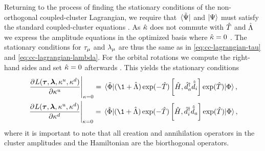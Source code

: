             Returning to the process of finding the stationary conditions of the
            non-orthogonal coupled-cluster Lagrangian, we require that
            $\bra*{\tilde{\Psi}}$ and $\ket{\Psi}$ must satisfy the standard
            coupled-cluster equations \cite{rolf-nocc}.
            As $\hat{\kappa}$ does not commute with $\hat{T}$ and $\hat{\Lambda}$ we express
            the amplitude equations in the optimized basis where $\hat{\kappa} = 0$
            \cite{ugur-occ, rolf-nocc}.
            The stationary conditions for $\tau_{\mu}$ and
            $\lambda_{\mu}$ are thus the same as in
            \autoref{eq:cc-lagrangian-tau} and
            \autoref{eq:cc-lagrangian-lambda}.
            For the orbital rotations we compute the right-hand sides and set
            $\hat{\kappa} = 0$ afterwards \cite{ugur-occ}.
            This yields the stationary conditions
            \begin{gather}
                \left.
                \dpd{
                    L(\vfg{\clustamp}, \vfg{\clustlamp},
                    \noccten^{u}, \noccten^{d})
                }{
                    {\noccten^{u}}
                }
                \right\rvert_{\noccten = 0}
                = \mel*{\tilde{\slat}}{
                    (\1 + \clustl)
                    \exponential(-\clust)
                    \com{\hamil}{\biccr{a}\bican{i}}
                    \exponential(\clust)
                }{\slat},
                \label{eq:nocc-kappa-up-rhs}
                \\
                \left.
                \dpd{
                    L(\vfg{\clustamp}, \vfg{\clustlamp},
                    \noccten^{u}, \noccten^{d})
                }{
                    {\noccten^{d}}
                }
                \right\rvert_{\noccten = 0}
                = \mel*{\tilde{\slat}}{
                    (\1 + \clustl)
                    \exponential(-\clust)
                    \com{\hamil}{\biccr{i}\bican{a}}
                    \exponential(\clust)
                }{\slat},
                \label{eq:nocc-kappa-down-rhs}
            \end{gather}
            where it is important to note that all creation and annihilation
            operators in the cluster amplitudes and the Hamiltonian are the
            biorthogonal operators.

